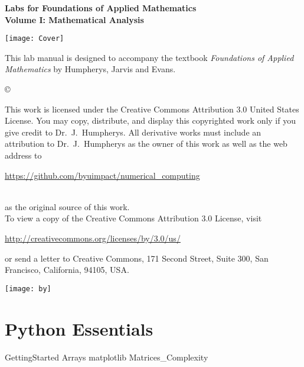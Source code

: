 \documentclass[nociteref]{SIAM-GH-book}
\begin{document}



\thispagestyle{empty}
\begin{center}
 
{\huge \bf Labs for Foundations of Applied Mathematics} \\
\vspace{5mm}
{\Large \bf Volume I: Mathematical Analysis}
\vspace{20mm}

\texttt{[image: Cover]}
\end{center}
\frontmatter




\begin{thepreface}
This lab manual is designed to accompany the textbook \emph{Foundations of Applied Mathematics} by Humpherys, Jarvis and Evans.

\vfill
\copyright{This work is licensed under the Creative Commons Attribution 3.0 United States
License.  You may copy, distribute, and display this copyrighted work only if you give
credit to Dr.~J.~Humpherys. All derivative works must include an attribution to Dr.~J.~Humpherys as the owner of this work as well as the web address to
\\\centerline{\url{https://github.com/byuimpact/numerical_computing}}\\ as the original source of
this
work.\\To view a copy of the Creative Commons Attribution 3.0 License,
visit\\\centerline{\url{http://creativecommons.org/licenses/by/3.0/us/}} or send a letter to
Creative Commons, 171 Second Street, Suite 300, San Francisco, California, 94105, USA.}

\vfill
\centering\texttt{[image: by]}
\vfill
\end{thepreface}

\setcounter{tocdepth}{1}
\tableofcontents

\mainmatter
\part{Python Essentials}
{GettingStarted}
{Arrays}
{matplotlib}
{Matrices_Complexity}
\end{document}

